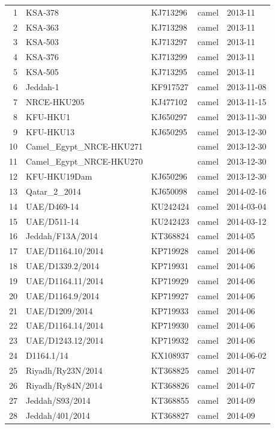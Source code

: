 \documentclass[9pt,lineno]{elife}
\begin{document}
\begin{longtable}{ | r | l | p{2cm} | l | l | }
  1 & KSA-378 & KJ713296 & camel & 2013-11 \\
  2 & KSA-363 & KJ713298 & camel & 2013-11 \\
  3 & KSA-503 & KJ713297 & camel & 2013-11 \\
  4 & KSA-376 & KJ713299 & camel & 2013-11 \\
  5 & KSA-505 & KJ713295 & camel & 2013-11 \\
  6 & Jeddah-1 & KF917527 & camel & 2013-11-08 \\
  7 & NRCE-HKU205 & KJ477102 & camel & 2013-11-15 \\
  8 & KFU-HKU1 & KJ650297 & camel & 2013-11-30 \\
  9 & KFU-HKU13 & KJ650295 & camel & 2013-12-30 \\
  10 & Camel\_Egypt\_NRCE-HKU271 &  & camel & 2013-12-30 \\
  11 & Camel\_Egypt\_NRCE-HKU270 &  & camel & 2013-12-30 \\
  12 & KFU-HKU19Dam & KJ650296 & camel & 2013-12-30 \\
  13 & Qatar\_2\_2014 & KJ650098 & camel & 2014-02-16 \\
  14 & UAE/D469-14 & KU242424 & camel & 2014-03-04 \\
  15 & UAE/D511-14 & KU242423 & camel & 2014-03-12 \\
  16 & Jeddah/F13A/2014 & KT368824 & camel & 2014-05 \\
  17 & UAE/D1164.10/2014 & KP719928 & camel & 2014-06 \\
  18 & UAE/D1339.2/2014 & KP719931 & camel & 2014-06 \\
  19 & UAE/D1164.11/2014 & KP719929 & camel & 2014-06 \\
  20 & UAE/D1164.9/2014 & KP719927 & camel & 2014-06 \\
  21 & UAE/D1209/2014 & KP719933 & camel & 2014-06 \\
  22 & UAE/D1164.14/2014 & KP719930 & camel & 2014-06 \\
  23 & UAE/D1243.12/2014 & KP719932 & camel & 2014-06 \\
  24 & D1164.1/14 & KX108937 & camel & 2014-06-02 \\
  25 & Riyadh/Ry23N/2014 & KT368825 & camel & 2014-07 \\
  26 & Riyadh/Ry84N/2014 & KT368826 & camel & 2014-07 \\
  27 & Jeddah/S93/2014 & KT368855 & camel & 2014-09 \\
  28 & Jeddah/401/2014 & KT368827 & camel & 2014-09 \\

\end{longtable}
\end{document}
